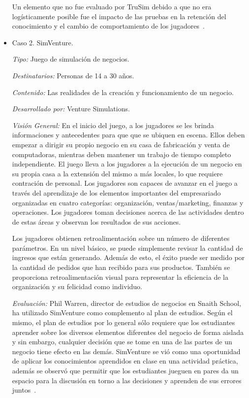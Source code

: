 \begin{itemize}
Un elemento que no fue evaluado por TruSim debido a que no era logísticamente posible fue el impacto
de las pruebas en la retención del conocimiento y el cambio de comportamiento de los jugadores~\cite{education:games}. 


\item Caso 2. SimVenture.

\emph{Tipo: } Juego de simulación de negocios.

\emph{Destinatarios: } Personas de 14 a 30 años.

\emph{Contenido: } Las realidades de la creación y funcionamiento de un negocio.

\emph{Desarrollado por: } Venture Simulations.

\emph{Visión General: } En el inicio del juego, a los jugadores se les brinda informaciones y 
antecedentes para que que se ubiquen en escena. Ellos deben empezar a dirigir su propio negocio
en su casa de fabricación y venta de computadoras, mientras deben mantener un trabajo de tiempo
completo independiente. El juego lleva a los jugadores a la ejecución de un negocio en su propia
casa a la extensión del mismo a más locales, lo que requiere contración de personal. Los jugadores
son capaces de avanzar en el juego a través del aprendizaje de los elementos importantes del 
empresariado organizadas en cuatro categorías: organización, ventas/marketing, finanzas y operaciones.
Los jugadores toman decisiones acerca de las actividades dentro de estas áreas y observan los resultados
de sus acciones. 

Los jugadores obtienen retroalimentación sobre un número de diferentes parámetros. En un nivel básico, 
se puede simplemente revisar la cantidad de ingresos que están generando. Además de esto, el éxito 
puede ser medido por la cantidad de pedidos que han recibido para sus productos. También se proporciona 
retroalimentación visual para representar la eficiencia de la organización y su felicidad como individuo.

\emph{Evaluación: } Phil Warren, director de estudios de negocios en Snaith
School, ha utilizado SimVenture como complemento al plan de estudios. Según el mismo, el plan de estudios
por lo general sólo requiere que los estudiantes aprender sobre los diversos elementos diferentes del 
negocio de forma aislada y sin embargo, cualquier decisión que se tome en una de las partes de un negocio 
tiene efecto en las demás. SimVenture se vió como una oportunidad de aplicar los conocimientos aprendidos
en clase en una actividad práctica, además se observó que permitir que los estudiantes jueguen en pares 
da un espacio para la discusión en torno a las decisiones y aprenden de sus errores juntos~\cite{education:games}.

\end{itemize}